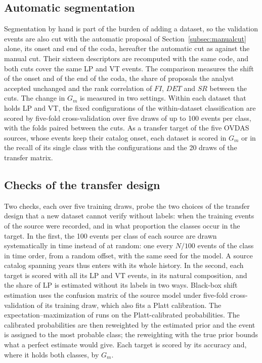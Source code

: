 \documentclass[pdflatex,sn-mathphys-num]{sn-jnl}
\begin{document}
\subsection{Automatic segmentation}\label{subsec:autocut}

Segmentation by hand is part of the burden of adding a dataset, so the
validation events are also cut with the automatic proposal of
Section~\ref{subsec:manualcut} alone, its onset and end of the coda,
hereafter the automatic cut as against the manual cut. Their sixteen
descriptors are recomputed with the same code, and both cuts cover the same
LP and VT events. The comparison measures the shift of the onset and of the
end of the coda, the share of proposals the analyst accepted unchanged and
the rank correlation of $FI$, $DET$ and $SR$ between the cuts. The change
in $G_m$ is measured in two settings. Within each dataset that holds LP and
VT, the fixed configurations of the within-dataset classification are
scored by five-fold cross-validation over five draws of up to 100 events
per class, with the folds paired between the cuts. As a transfer target of
the five OVDAS sources, whose events keep their catalog onset, each dataset
is scored in $G_m$ or in the recall of its single class with the
configurations and the 20 draws of the transfer matrix.

\subsection{Checks of the transfer design}\label{subsec:checks}

Two checks, each over five training draws, probe the two choices of the
transfer design that a new dataset cannot verify without labels: when the
training events of the source were recorded, and in what proportion the
classes occur in the target. In the first, the 100 events per class of each source are drawn
systematically in time instead of at random: one every $N/100$ events of
the class in time order, from a random offset, with the same seed for the
model. A source catalog spanning years thus enters with its whole history.
In the second, each target is scored with all its LP and VT events, in its
natural composition, and the share of LP is estimated without its labels in
two ways. Black-box shift estimation \cite{lipton_detecting_2018} uses the
confusion matrix of the source model under five-fold cross-validation of
its training draw, which also fits a Platt calibration. The
expectation--maximization of \cite{saerens_adjusting_2002} runs on the
Platt-calibrated probabilities. The calibrated probabilities are then
reweighted by the estimated prior and the event is assigned to the most
probable class; the reweighting with the true prior bounds what a perfect
estimate would give. Each target is scored by its accuracy and, where it holds both classes,
by $G_m$.
\end{document}
